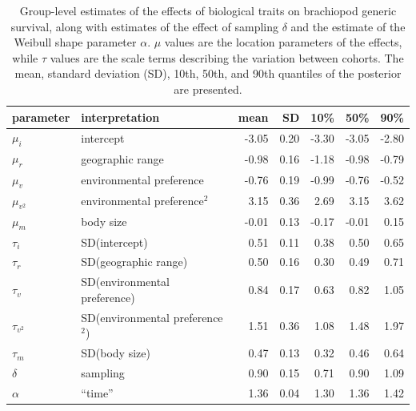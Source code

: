 \documentclass{article}
\begin{document}
\begin{table}[h]
  \centering
  \caption{Group-level estimates of the effects of biological traits on brachiopod generic survival, along with estimates of the effect of sampling \(\delta\) and the estimate of the Weibull shape parameter \(\alpha\). \(\mu\) values are the location parameters of the effects, while \(\tau\) values are the scale terms describing the variation between cohorts. The mean, standard deviation (SD), 10th, 50th, and 90th quantiles of the posterior are presented.}
  \begin{tabular}{ l l r r r r r }
    \hline
    parameter & interpretation & mean & SD & 10\% & 50\% & 90\% \\ 
    \hline
    \(\mu_{i}\) & intercept & -3.05 & 0.20 & -3.30 & -3.05 & -2.80 \\
    \(\mu_{r}\) & geographic range & -0.98 & 0.16 & -1.18 & -0.98 & -0.79 \\
    \(\mu_{v}\) & environmental preference & -0.76 & 0.19 & -0.99 & -0.76 & -0.52 \\
    \(\mu_{v^{2}}\) & environmental preference\(^{2}\) & 3.15 & 0.36 & 2.69 & 3.15 & 3.62 \\
    \(\mu_{m}\) & body size &  -0.01 & 0.13 & -0.17 & -0.01 & 0.15 \\
    \hline
    \(\tau_{i}\) & SD(intercept) & 0.51 & 0.11 & 0.38 & 0.50 & 0.65 \\
    \(\tau_{r}\) & SD(geographic range) & 0.50 & 0.16 & 0.30 & 0.49 & 0.71 \\ 
    \(\tau_{v}\) & SD(environmental preference) & 0.84 & 0.17 & 0.63 & 0.82 & 1.05 \\
    \(\tau_{v^{2}}\) & SD(environmental preference\(^{2}\)) & 1.51 & 0.36 & 1.08 & 1.48 & 1.97 \\
    \(\tau_{m}\) & SD(body size) & 0.47 & 0.13 & 0.32 & 0.46 & 0.64 \\ 
    \hline
    \(\delta\) & sampling & 0.90 & 0.15 & 0.71 & 0.90 & 1.09 \\ 
    \(\alpha\) & ``time'' & 1.36 & 0.04 & 1.30 & 1.36 & 1.42 \\ 
    \hline
  \end{tabular}
  \label{tab:param}
\end{table}


\clearpage
\end{document}
